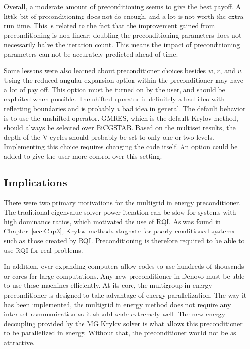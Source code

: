 Overall, a moderate amount of preconditioning seems to give the best payoff. A little bit of preconditioning does not do enough, and a lot is not worth the extra run time. This is related to the fact that the improvement gained from preconditioning is non-linear; doubling the preconditioning parameters does not necessarily halve the iteration count. This means the impact of preconditioning parameters can not be accurately predicted ahead of time. 

Some lessons were also learned about preconditioner choices besides $w$, $r$, and $v$. Using the reduced angular expansion option within the preconditioner may have a lot of pay off. This option must be turned on by the user, and should be exploited when possible. The shifted operator is definitely a bad idea with reflecting boundaries and is probably a bad idea in general. The default behavior is to use the unshifted operator. GMRES, which is the default Krylov method, should always be selected over BiCGSTAB. Based on the multiset results, the depth of the V-cycles should probably be set to only one or two levels. Implementing this choice requires changing the code itself. An option could be added to give the user more control over this setting.

\subsection{Implications}
There were two primary motivations for the multigrid in energy preconditioner. The traditional eigenvalue solver power iteration can be slow for systems with high dominance ratios, which motivated the use of RQI. As was found in Chapter~\ref{sec:Chp3}, Krylov methods stagnate for poorly conditioned systems such as those created by RQI. Preconditioning is therefore required to be able to use RQI for real problems. 

In addition, ever-expanding computers allow codes to use hundreds of thousands or cores for large computations. Any new preconditioner in Denovo must be able to use these machines efficiently. At its core, the multigroup in energy preconditioner is designed to take advantage of energy parallelization. The way it has been implemented, the multigrid in energy method does not require any inter-set communication so it should scale extremely well. The new energy decoupling provided by the MG Krylov solver is what allows this preconditioner to be parallelized in energy. Without that, the preconditioner would not be as attractive. 

